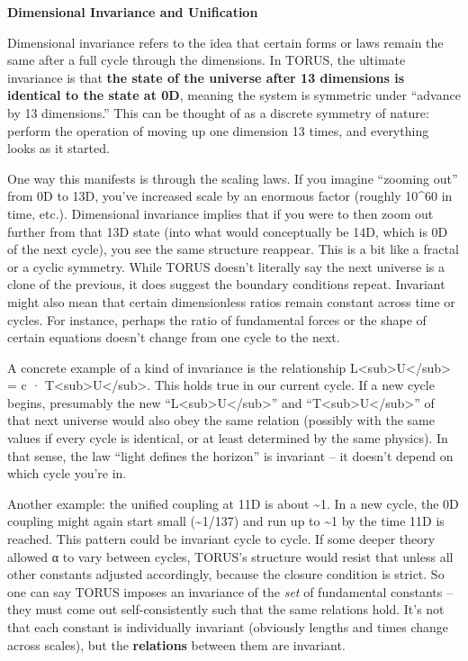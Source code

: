 \documentclass[
]{article}
\begin{document}
\textbf{Dimensional Invariance and Unification}

Dimensional invariance refers to the idea that certain forms or laws
remain the same after a full cycle through the dimensions. In TORUS, the
ultimate invariance is that \textbf{the state of the universe after 13
dimensions is identical to the state at 0D}, meaning the system is
symmetric under ``advance by 13 dimensions.'' This can be thought of as
a discrete symmetry of nature: perform the operation of moving up one
dimension 13 times, and everything looks as it started\hspace{0pt}.

One way this manifests is through the scaling laws. If you imagine
``zooming out'' from 0D to 13D, you've increased scale by an enormous
factor (roughly 10\^{}60 in time, etc.). Dimensional invariance implies
that if you were to then zoom out further from that 13D state (into what
would conceptually be 14D, which is 0D of the next cycle), you see the
same structure reappear. This is a bit like a fractal or a cyclic
symmetry. While TORUS doesn't literally say the next universe is a clone
of the previous, it does suggest the boundary conditions repeat.
Invariant might also mean that certain dimensionless ratios remain
constant across time or cycles. For instance, perhaps the ratio of
fundamental forces or the shape of certain equations doesn't change from
one cycle to the next.

A concrete example of a kind of invariance is the relationship
L\textless sub\textgreater U\textless/sub\textgreater{} = c ·
T\textless sub\textgreater U\textless/sub\textgreater. This holds true
in our current cycle. If a new cycle begins, presumably the new
``L\textless sub\textgreater U\textless/sub\textgreater'' and
``T\textless sub\textgreater U\textless/sub\textgreater'' of that next
universe would also obey the same relation (possibly with the same
values if every cycle is identical, or at least determined by the same
physics). In that sense, the law ``light defines the horizon'' is
invariant -- it doesn't depend on which cycle you're in.

Another example: the unified coupling at 11D is about \textasciitilde1.
In a new cycle, the 0D coupling might again start small
(\textasciitilde1/137) and run up to \textasciitilde1 by the time 11D is
reached. This pattern could be invariant cycle to cycle. If some deeper
theory allowed α to vary between cycles, TORUS's structure would resist
that unless all other constants adjusted accordingly, because the
closure condition is strict. So one can say TORUS imposes an invariance
of the \emph{set} of fundamental constants -- they must come out
self-consistently such that the same relations hold. It's not that each
constant is individually invariant (obviously lengths and times change
across scales), but the \textbf{relations} between them are invariant.
\end{document}
